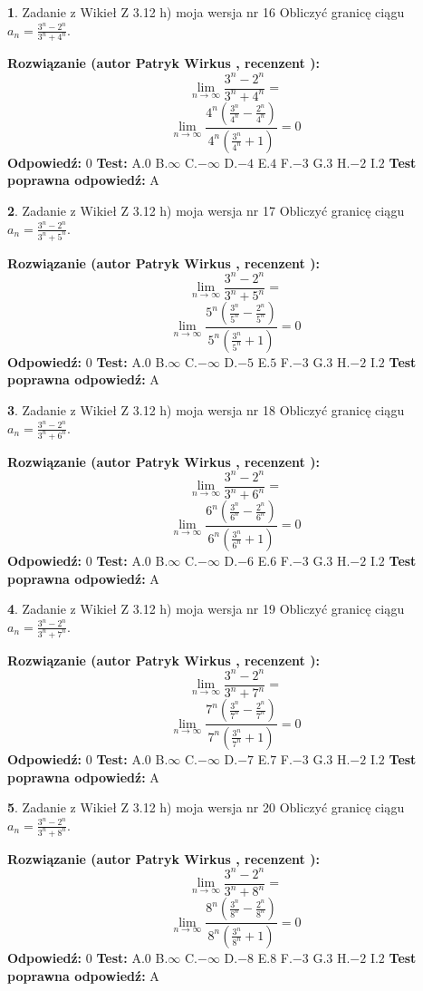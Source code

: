 \documentclass[12pt, a4paper]{article}
\theoremstyle{definition} %
\newtheorem{zad}{}
\newcommand{\zadStart}[1]{\begin{zad}#1\newline}
\newcommand{\zadStop}{\end{zad}}
\newcommand{\rozwStart}[2]{\noindent \textbf{Rozwiązanie (autor #1 , recenzent #2): }\newline}
\newcommand{\rozwStop}{\newline}
\newcommand{\odpStart}{\noindent \textbf{Odpowiedź:}\newline}
\newcommand{\odpStop}{\newline}
\newcommand{\testStart}{\noindent \textbf{Test:}\newline}
\newcommand{\testStop}{\newline}
\newcommand{\kluczStart}{\noindent \textbf{Test poprawna odpowiedź:}\newline}
\newcommand{\kluczStop}{\newline}
\begin{document}
\zadStart{Zadanie z Wikieł Z 3.12 h) moja wersja nr 16}
Obliczyć granicę ciągu $a_{n}=\frac{3^{n} - 2^{n}}{3^{n} + 4^{n}}$.
\zadStop
\rozwStart{Patryk Wirkus}{}
$$\lim\limits_{n\to\infty}\frac{3^{n} - 2^{n}}{3^{n} + 4^{n}}=$$
$$\lim\limits_{n\to\infty}\frac{4^{n}(\frac{3^{n}}{4^{n}} - \frac{2^{n}}{4^{n}})}{4^{n}(\frac{3^{n}}{4^{n}} + 1)} = 0$$
\rozwStop
\odpStart
$0$
\odpStop
\testStart
A.$0$
B.$\infty$
C.$-\infty$
D.$-4$
E.$4$
F.$-3$
G.$3$
H.$-2$
I.$2$
\testStop
\kluczStart
A
\kluczStop



\zadStart{Zadanie z Wikieł Z 3.12 h) moja wersja nr 17}
Obliczyć granicę ciągu $a_{n}=\frac{3^{n} - 2^{n}}{3^{n} + 5^{n}}$.
\zadStop
\rozwStart{Patryk Wirkus}{}
$$\lim\limits_{n\to\infty}\frac{3^{n} - 2^{n}}{3^{n} + 5^{n}}=$$
$$\lim\limits_{n\to\infty}\frac{5^{n}(\frac{3^{n}}{5^{n}} - \frac{2^{n}}{5^{n}})}{5^{n}(\frac{3^{n}}{5^{n}} + 1)} = 0$$
\rozwStop
\odpStart
$0$
\odpStop
\testStart
A.$0$
B.$\infty$
C.$-\infty$
D.$-5$
E.$5$
F.$-3$
G.$3$
H.$-2$
I.$2$
\testStop
\kluczStart
A
\kluczStop



\zadStart{Zadanie z Wikieł Z 3.12 h) moja wersja nr 18}
Obliczyć granicę ciągu $a_{n}=\frac{3^{n} - 2^{n}}{3^{n} + 6^{n}}$.
\zadStop
\rozwStart{Patryk Wirkus}{}
$$\lim\limits_{n\to\infty}\frac{3^{n} - 2^{n}}{3^{n} + 6^{n}}=$$
$$\lim\limits_{n\to\infty}\frac{6^{n}(\frac{3^{n}}{6^{n}} - \frac{2^{n}}{6^{n}})}{6^{n}(\frac{3^{n}}{6^{n}} + 1)} = 0$$
\rozwStop
\odpStart
$0$
\odpStop
\testStart
A.$0$
B.$\infty$
C.$-\infty$
D.$-6$
E.$6$
F.$-3$
G.$3$
H.$-2$
I.$2$
\testStop
\kluczStart
A
\kluczStop



\zadStart{Zadanie z Wikieł Z 3.12 h) moja wersja nr 19}
Obliczyć granicę ciągu $a_{n}=\frac{3^{n} - 2^{n}}{3^{n} + 7^{n}}$.
\zadStop
\rozwStart{Patryk Wirkus}{}
$$\lim\limits_{n\to\infty}\frac{3^{n} - 2^{n}}{3^{n} + 7^{n}}=$$
$$\lim\limits_{n\to\infty}\frac{7^{n}(\frac{3^{n}}{7^{n}} - \frac{2^{n}}{7^{n}})}{7^{n}(\frac{3^{n}}{7^{n}} + 1)} = 0$$
\rozwStop
\odpStart
$0$
\odpStop
\testStart
A.$0$
B.$\infty$
C.$-\infty$
D.$-7$
E.$7$
F.$-3$
G.$3$
H.$-2$
I.$2$
\testStop
\kluczStart
A
\kluczStop



\zadStart{Zadanie z Wikieł Z 3.12 h) moja wersja nr 20}
Obliczyć granicę ciągu $a_{n}=\frac{3^{n} - 2^{n}}{3^{n} + 8^{n}}$.
\zadStop
\rozwStart{Patryk Wirkus}{}
$$\lim\limits_{n\to\infty}\frac{3^{n} - 2^{n}}{3^{n} + 8^{n}}=$$
$$\lim\limits_{n\to\infty}\frac{8^{n}(\frac{3^{n}}{8^{n}} - \frac{2^{n}}{8^{n}})}{8^{n}(\frac{3^{n}}{8^{n}} + 1)} = 0$$
\rozwStop
\odpStart
$0$
\odpStop
\testStart
A.$0$
B.$\infty$
C.$-\infty$
D.$-8$
E.$8$
F.$-3$
G.$3$
H.$-2$
I.$2$
\testStop
\kluczStart
A
\kluczStop
\end{document}
